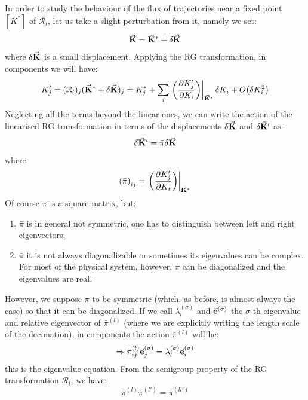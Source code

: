\documentclass[../../Main/Main.tex]{subfiles}
\begin{document}
In order to study the behaviour of the flux of trajectories near a fixed point \( [K^*] \) of \( \mathcal{R}_l \), let us take a slight perturbation from it, namely we set:
\begin{equation}
  \va{K} = \va{K}^* + \delta \va{K}
\end{equation}
where \( \delta \va{K} \) is a small displacement. Applying the RG transformation, in components we will have:
\begin{equation*}
  K'_j = (\mathcal{R}_l)_j (\va{K}^*+ \delta \va{K} )_j
= K^*_j + \sum_{i}^{} \eval{\qty(\pdv{K_j'}{K_i} )}_{\va{K}^*} \delta K_i + O \qty(\delta K_i^2)
\end{equation*}
Neglecting all the terms beyond the linear ones, we can write the action of the linearised RG transformation in terms of the displacements \( \delta \va{K} \) and
\( \delta \va{K}' \) as:
\begin{equation}
  \delta \va{K}' = \bar{\pi } \delta \va{K}
\end{equation}
where
\begin{equation}
  \qty(\bar{\pi } )_{ij} = \eval{\qty(\pdv{K_j'}{K_i} )}_{\va{K}^*}
\end{equation}
Of course \( \bar{\pi } \) is a square matrix, but:
\begin{enumerate}
\item \( \bar{\pi }  \) is in general not symmetric, one has to distinguish between left and right eigenvectors;
\item \( \bar{\pi }  \) it is not always diagonalizable or sometimes its eigenvalues can be complex. For most of the physical system, however, \( \bar{\pi }  \) can be diagonalized and the eigenvalues are real.
\end{enumerate}
However, we suppose \( \bar{\pi } \) to be symmetric (which, as before, is almost always the case) so that it can be diagonalized. If we call \( \lambda _l^{(\sigma)} \) and \( \va{e}^{(\sigma )} \) the \( \sigma  \)-th  eigenvalue and relative eigenvector of \( \bar{\pi }^{(l)} \)  (where we are explicitly writing the length scale of the decimation), in components the action \(\bar{\pi }^{(l)}  \) will be:
\begin{equation}
  \Rightarrow \bar{\pi }^{(l)}_{ij} \va{e}^{(\sigma )}_j = \lambda _l^{(\sigma )} \va{e}_i ^{(\sigma )}
\end{equation}
this is the eigenvalue equation. From the semigroup property of the RG transformation \( \mathcal{R}_l \), we have:
\begin{equation*}
  \bar{\pi }^{(l)} \bar{\pi }^{(l')} = \bar{\pi }^{(ll')}
\end{equation*}
\end{document}
